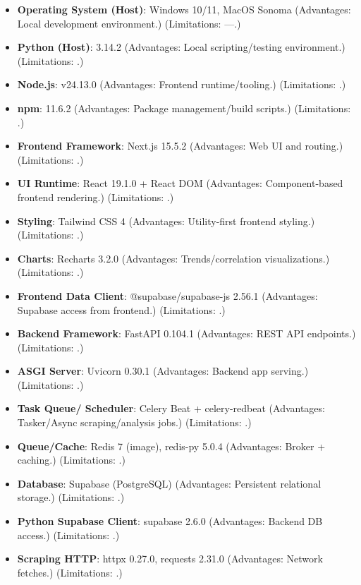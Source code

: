\begin{itemize}
\item \textbf{Operating System (Host)}: Windows 10/11, MacOS Sonoma (Advantages: Local development environment.) (Limitations: ---.)
\item \textbf{Python (Host)}: 3.14.2 (Advantages: Local scripting/testing environment.) (Limitations: \cite{ref37}.)
\item \textbf{Node.js}: v24.13.0 (Advantages: Frontend runtime/tooling.) (Limitations: \cite{ref38}.)
\item \textbf{npm}: 11.6.2 (Advantages: Package management/build scripts.) (Limitations: \cite{ref40}.)
\item \textbf{Frontend Framework}: Next.js 15.5.2 (Advantages: Web UI and routing.) (Limitations: \cite{ref31}.)
\item \textbf{UI Runtime}: React 19.1.0 + React DOM (Advantages: Component-based frontend rendering.) (Limitations: \cite{ref32}.)
\item \textbf{Styling}: Tailwind CSS 4 (Advantages: Utility-first frontend styling.) (Limitations: \cite{ref33}.)
\item \textbf{Charts}: Recharts 3.2.0 (Advantages: Trends/correlation visualizations.) (Limitations: \cite{ref34}.)
\item \textbf{Frontend Data Client}: @supabase/supabase-js 2.56.1 (Advantages: Supabase access from frontend.) (Limitations: \cite{ref19}.)
\item \textbf{Backend Framework}: FastAPI 0.104.1 (Advantages: REST API endpoints.) (Limitations: \cite{ref27}.)
\item \textbf{ASGI Server}: Uvicorn 0.30.1 (Advantages: Backend app serving.) (Limitations: \cite{ref28}.)
\item \textbf{Task Queue/ Scheduler}: Celery Beat + celery-redbeat (Advantages: Tasker/Async scraping/analysis jobs.) (Limitations: \cite{ref29}.)
\item \textbf{Queue/Cache}: Redis 7 (image), redis-py 5.0.4 (Advantages: Broker + caching.) (Limitations: \cite{ref15}.)
\item \textbf{Database}: Supabase (PostgreSQL) (Advantages: Persistent relational storage.) (Limitations: \cite{ref06,ref19}.)
\item \textbf{Python Supabase Client}: supabase 2.6.0 (Advantages: Backend DB access.) (Limitations: \cite{ref19}.)
\item \textbf{Scraping HTTP}: httpx 0.27.0, requests 2.31.0 (Advantages: Network fetches.) (Limitations: \cite{ref41}.)

\end{itemize}
